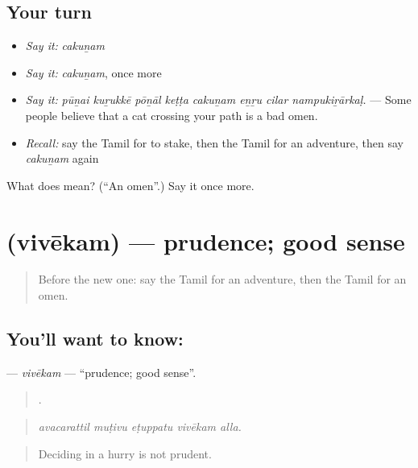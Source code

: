 \subsection*{Your turn}
\begin{itemize}
\raggedright
  \item \emph{Say it:} \emph{cakuṉam}
  \item \emph{Say it:} \emph{cakuṉam}, once more
  \item \emph{Say it:} \emph{pūṉai kuṟukkē pōṉāl keṭṭa cakuṉam eṉṟu cilar nampukiṟārkaḷ.} — Some people believe that a cat crossing your path is a bad omen.
  \item \emph{Recall:} say the Tamil for to stake, then the Tamil for an adventure, then say \emph{cakuṉam} again
\end{itemize}

\begin{tcolorbox}[breakable,colback=teal!4,colframe=teal!35!black,title={Before you move on}]
What does  mean? (\textquotedblleft{}An omen\textquotedblright{}.) Say it once more.
\end{tcolorbox}
\section[\texorpdfstring{\ta{விவேகம்} (vivēkam)}{விவேகம் (vivēkam)}]{ (vivēkam) — prudence; good sense}

\label{lesson:TA-C544-vivekam}



\begin{quote}
Before the new one: say the Tamil for an adventure, then the Tamil for an omen.
\end{quote}

\subsection*{You'll want to know: }
\textbf{} — \emph{vivēkam} — \textquotedblleft{}prudence; good sense\textquotedblright{}.

\begin{quote}
    .
\end{quote}

\begin{quote}
\emph{avacarattil muṭivu eṭuppatu vivēkam alla.}
\end{quote}

\begin{quote}
Deciding in a hurry is not prudent.
\end{quote}

